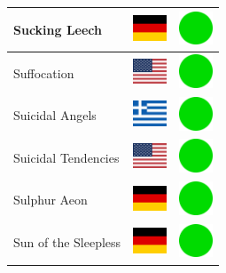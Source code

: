 \documentclass[12pt, a4paper, twoside]{report}
\begin{document}
\begin{center}
\begin{longtable}{|p{5cm}|p{2cm}|p{2cm}|}
Sucking Leech & \includegraphics[width=1cm]{4x3/de} & \includegraphics[width=1cm]{likes/y} \\ \hline
Suffocation & \includegraphics[width=1cm]{4x3/us} & \includegraphics[width=1cm]{likes/y} \\ \hline
Suicidal Angels & \includegraphics[width=1cm]{4x3/gr} & \includegraphics[width=1cm]{likes/y} \\ \hline
Suicidal Tendencies & \includegraphics[width=1cm]{4x3/us} & \includegraphics[width=1cm]{likes/y} \\ \hline
Sulphur Aeon & \includegraphics[width=1cm]{4x3/de} & \includegraphics[width=1cm]{likes/y} \\ \hline
Sun of the Sleepless & \includegraphics[width=1cm]{4x3/de} & \includegraphics[width=1cm]{likes/y} \\ \hline

\end{longtable}
\end{center}
\end{document}

